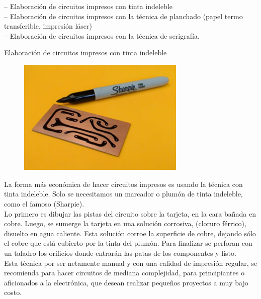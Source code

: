 \documentclass[12pt]{article}
\begin{document}
– Elaboración de circuitos impresos con tinta indeleble\\
– Elaboración de circuitos impresos con la técnica de planchado (papel termo transferible, impresión láser)\\
– Elaboración de circuitos impresos con la técnica de serigrafía.\par

Elaboración de circuitos impresos con tinta indeleble\par




\begin{figure}[H]
	\begin{Center}
		\includegraphics[width=3.15in,height=2.18in]{./media/image6.jpeg}
	\end{Center}
\end{figure}



\par

La forma más económica de hacer circuitos impresos es usando la técnica con tinta indeleble. Solo se necesitamos un marcador o plumón de tinta indeleble, como el famoso (Sharpie).\\
Lo primero es dibujar las pistas del circuito sobre la tarjeta, en la cara bañada en cobre. Luego, se sumerge la tarjeta en una solución corrosiva, (cloruro férrico), disuelto en agua caliente. Esta solución corroe la superficie de cobre, dejando sólo el cobre que está cubierto por la tinta del plumón. Para finalizar se perforan con un taladro los orificios donde entrarán las patas de los componentes y listo.\\
Esta técnica por ser netamente manual y con una calidad de impresión regular, se recomienda para hacer circuitos de mediana complejidad, para principiantes o aficionados a la electrónica, que desean realizar pequeños proyectos a muy bajo costo.\par
\end{document}
